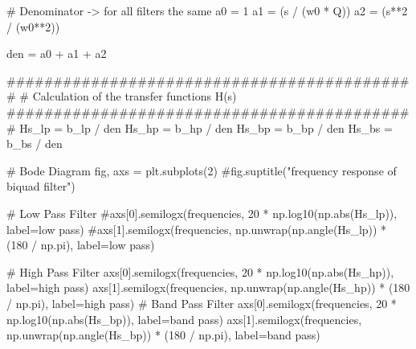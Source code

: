 \documentclass[
  letterpaper,
]{scrbook}
\newenvironment{Shaded}{}{}
\newcommand{\BuiltInTok}[1]{\textcolor[rgb]{0.84,0.23,0.29}{#1}}
\newcommand{\CommentTok}[1]{\textcolor[rgb]{0.42,0.45,0.49}{#1}}
\newcommand{\DecValTok}[1]{\textcolor[rgb]{0.00,0.36,0.77}{#1}}
\newcommand{\NormalTok}[1]{\textcolor[rgb]{0.14,0.16,0.18}{#1}}
\newcommand{\OperatorTok}[1]{\textcolor[rgb]{0.14,0.16,0.18}{#1}}
\newcommand{\StringTok}[1]{\textcolor[rgb]{0.01,0.18,0.38}{#1}}
\begin{document}
\begin{codelisting}
{\begin{Shaded}
\begin{Highlighting}[]
\CommentTok{\# Denominator {-}\textgreater{} for all filters the same}
\NormalTok{a0 }\OperatorTok{=} \DecValTok{1}
\NormalTok{a1 }\OperatorTok{=}\NormalTok{ (s }\OperatorTok{/}\NormalTok{ (w0 }\OperatorTok{*}\NormalTok{ Q))}
\NormalTok{a2 }\OperatorTok{=}\NormalTok{ (s}\OperatorTok{**}\DecValTok{2} \OperatorTok{/}\NormalTok{ (w0}\OperatorTok{**}\DecValTok{2}\NormalTok{))}

\NormalTok{den }\OperatorTok{=}\NormalTok{ a0 }\OperatorTok{+}\NormalTok{ a1 }\OperatorTok{+}\NormalTok{ a2}

\CommentTok{\#\#\#\#\#\#\#\#\#\#\#\#\#\#\#\#\#\#\#\#\#\#\#\#\#\#\#\#\#\#\#\#\#\#\#\#\#\#\#\#\#\#\#\#}
\CommentTok{\# Calculation of the transfer functions H(s)}
\CommentTok{\#\#\#\#\#\#\#\#\#\#\#\#\#\#\#\#\#\#\#\#\#\#\#\#\#\#\#\#\#\#\#\#\#\#\#\#\#\#\#\#\#\#\#\#}
\NormalTok{Hs\_lp }\OperatorTok{=}\NormalTok{ b\_lp }\OperatorTok{/}\NormalTok{ den}
\NormalTok{Hs\_hp }\OperatorTok{=}\NormalTok{ b\_hp }\OperatorTok{/}\NormalTok{ den}
\NormalTok{Hs\_bp }\OperatorTok{=}\NormalTok{ b\_bp }\OperatorTok{/}\NormalTok{ den}
\NormalTok{Hs\_bs }\OperatorTok{=}\NormalTok{ b\_bs }\OperatorTok{/}\NormalTok{ den}

\CommentTok{\# Bode Diagram}
\NormalTok{fig, axs }\OperatorTok{=}\NormalTok{ plt.subplots(}\DecValTok{2}\NormalTok{)}
\CommentTok{\#fig.suptitle("frequency response of biquad filter")}

\CommentTok{\# Low Pass Filter}
\CommentTok{\#axs[0].semilogx(frequencies, 20 * np.log10(np.abs(Hs\_lp)), label=\textquotesingle{}low pass\textquotesingle{})}
\CommentTok{\#axs[1].semilogx(frequencies, np.unwrap(np.angle(Hs\_lp)) * (180 / np.pi), label=\textquotesingle{}low pass\textquotesingle{})}

\CommentTok{\# High Pass Filter}
\NormalTok{axs[}\DecValTok{0}\NormalTok{].semilogx(frequencies, }\DecValTok{20} \OperatorTok{*}\NormalTok{ np.log10(np.}\BuiltInTok{abs}\NormalTok{(Hs\_hp)), label}\OperatorTok{=}\StringTok{\textquotesingle{}high pass\textquotesingle{}}\NormalTok{)}
\NormalTok{axs[}\DecValTok{1}\NormalTok{].semilogx(frequencies, np.unwrap(np.angle(Hs\_hp)) }\OperatorTok{*}\NormalTok{ (}\DecValTok{180} \OperatorTok{/}\NormalTok{ np.pi), label}\OperatorTok{=}\StringTok{\textquotesingle{}high pass\textquotesingle{}}\NormalTok{)}
\CommentTok{\textquotesingle{}\textquotesingle{}\textquotesingle{}}
\CommentTok{\# Band Pass Filter}
\CommentTok{axs[0].semilogx(frequencies, 20 * np.log10(np.abs(Hs\_bp)), label=\textquotesingle{}band pass\textquotesingle{})}
\CommentTok{axs[1].semilogx(frequencies, np.unwrap(np.angle(Hs\_bp)) * (180 / np.pi), label=\textquotesingle{}band pass\textquotesingle{})}


\end{Highlighting}
\end{Shaded}}
\end{codelisting}
\end{document}
